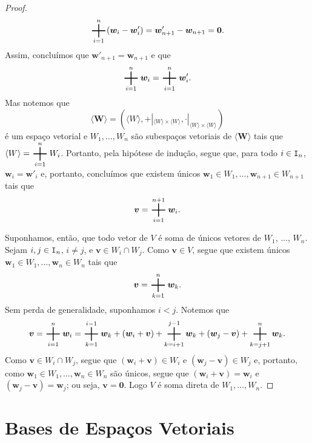 \begin{proof}
	\begin{equation*}
	\bigplus_{i=1}^n (\bm w_i - \bm w'_i) = \bm w'_{n+1} - \bm w_{n+1} = \bm 0.
	\end{equation*}
Assim, concluímos que $\bm w'_{n+1}=\bm w_{n+1}$ e que
	\begin{equation*}
	\bigplus_{i=1}^n \bm w_i = \bigplus_{i=1}^n \bm w'_i.
	\end{equation*}
Mas notemos que
	\begin{equation*}
	\bm{\langle W \rangle}=(\langle W \rangle,+|_{\langle W \rangle \times \langle W \rangle},\cdot|_{\langle W \rangle \times \langle W \rangle})
	\end{equation*}
é um espaço vetorial e $W_1,\ldots,W_n$ são subespaços vetoriais de $\bm{\langle W \rangle}$ tais que $\langle W \rangle=\displaystyle\bigplus_{i=1}^n W_i$. Portanto, pela hipótese de indução, segue que, para todo $i \in \mathtt I_n$, $\bm w_i = \bm w'_i$ e, portanto, concluímos que existem únicos $\bm w_1 \in W_1,\ldots,\bm w_{n+1} \in W_{n+1}$ tais que
	\begin{equation*}
	\bm v = \bigplus_{i=1}^{n+1} \bm w_i.
	\end{equation*}

	Suponhamos, então, que todo vetor de $V$ é soma de únicos vetores de $W_1$, $\ldots$, $W_n$. Sejam $i,j \in \mathtt I_n$, $i \neq j$, e $\bm v \in W_i \cap W_j$. Como $\bm v \in V$, segue que existem únicos $\bm w_1 \in W_1, \ldots, \bm w_n \in W_n$ tais que
	\begin{equation*}
	\bm v = \bigplus_{k=1}^n \bm w_k.
	\end{equation*}
Sem perda de generalidade, suponhamos $i<j$. Notemos que
	\begin{equation*}
	\bm v = \bigplus_{i=1}^n \bm w_i = \bigplus_{k=1}^{i-1} \bm w_k + (\bm w_i+\bm v) +  \bigplus_{k=i+1}^{j-1} \bm w_k + (\bm w_j - \bm v) + \bigplus_{k=j+1}^n \bm w_k.
	\end{equation*}
Como $\bm v \in W_i \cap W_j$, segue que $(\bm w_i+\bm v) \in W_i$ e $(\bm w_j - \bm v) \in W_j$ e, portanto, como $\bm w_1 \in W_1, \ldots, \bm w_n \in W_n$ são únicos, segue que $(\bm w_i+\bm v) = \bm w_i$ e $(\bm w_j - \bm v) = \bm w_j$; ou seja, $\bm v = \bm 0$. Logo $V$ é soma direta de $W_1,\ldots,W_n$.
\end{proof}


\section{Bases de Espaços Vetoriais}

